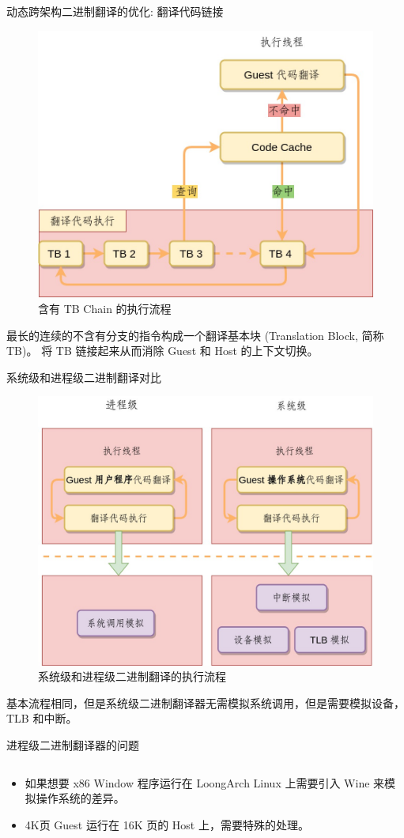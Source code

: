 \documentclass{beamer}
\begin{document}
\begin{frame}{动态跨架构二进制翻译的优化: 翻译代码链接}
	\begin{figure}
		\includegraphics[width=0.5\linewidth]{../paper/images/basic-flow4.jpg}
		\caption{含有 TB Chain 的执行流程}
	\end{figure}
	最长的连续的不含有分支的指令构成一个翻译基本块 (Translation Block, 简称 TB)。
	将 TB 链接起来从而消除 Guest 和 Host 的上下文切换。
\end{frame}

\begin{frame}{系统级和进程级二进制翻译对比}
	\begin{figure}
		\includegraphics[width=0.5\linewidth]{../paper/images/user-sys-flow.jpg}
		\caption{系统级和进程级二进制翻译的执行流程}
	\end{figure}
	基本流程相同，但是系统级二进制翻译器无需模拟系统调用，但是需要模拟设备，TLB 和中断。
\end{frame}

\begin{frame}{进程级二进制翻译器的问题}
	\begin{columns}[T,onlytextwidth]
		\begin{alertblock}{}
			\begin{itemize}
				\item 如果想要 x86 Window 程序运行在 LoongArch Linux 上需要引入 Wine 来模拟操作系统的差异。
				\item 4K页 Guest 运行在 16K 页的 Host 上，需要特殊的处理。
			\end{itemize}
		\end{alertblock}
	\end{columns}
\end{frame}
\end{document}
